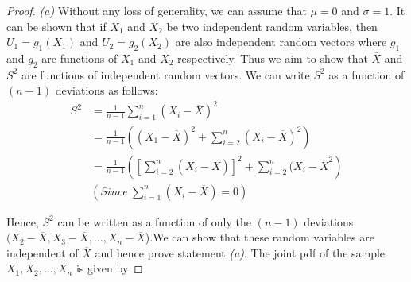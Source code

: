 \documentclass[a4paper,english,12pt]{article}
\begin{document}
\begin{proof}

\textit{(a)} Without any loss of generality, we can assume that $\mu=0$ and $\sigma=1$. It can be shown that if $X_1$ and $X_2$ be two independent random variables, then $U_1=g_1(X_1)$ and $U_2=g_2(X_2)$ are also independent random vectors where $g_1$ and $g_2$ are functions of $X_1$ and $X_2$ respectively. Thus we aim to show that $\overline{X}$ and $S^2$ are functions of independent random vectors.   
We can write $S^2$ as a function of $(n-1)$ deviations as follows: 
\begin{align}
S^2&=\frac{1}{n-1}\sum_{i=1}^n(X_i-\overline{X})^2 \nonumber \\
&= \frac{1}{n-1}\left((X_1-\overline{X})^2+\sum_{i=2}^n
(X_i-\overline{X})^2\right) \nonumber \\
&=\frac{1}{n-1}\left(\left[\sum_{i=2}^n(X_i-\overline{X})\right]^2+\sum_{i=2}^n(X_i-\overline{X}^2\right) \\
& (Since~\sum_{i=1}^n(X_i-\overline{X})=0) \nonumber
\end{align}

Hence, $S^2$ can be written as a function of only the $(n-1)$ deviations   $(X_2-\overline{X},X_3-\overline{X},\dots,X_n-\overline{X}$).We can show that these random variables are independent of $\overline{X}$ and hence prove statement \textit{(a)}. The joint pdf of the sample $X_1,X_2,\dots,X_n$ is given by 


\end{proof}
\end{document}
